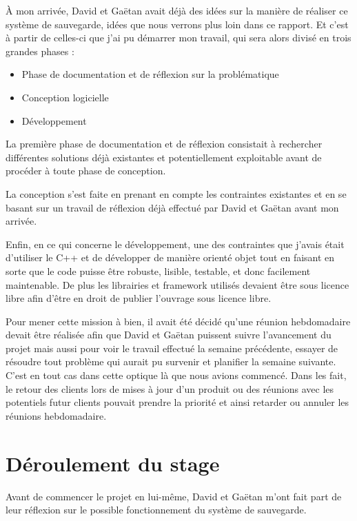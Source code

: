 \documentclass[a4paper,10pt, twoside]{report}
\begin{document}
\begin{spacing}{1.2}
\`A mon arriv\'ee, David et Ga\"etan avait d\'ej\`a des id\'ees sur la
mani\`ere de r\'ealiser ce syst\`eme de sauvegarde, id\'ees que nous verrons
plus loin dans ce rapport. Et c'est \`a partir de celles-ci que j'ai pu
d\'emarrer mon travail, qui sera alors divis\'e en trois grandes phases :

\begin{itemize}
 \item Phase de documentation et de r\'eflexion sur la probl\'ematique
 \item Conception logicielle
 \item D\'eveloppement
\end{itemize}

La premi\`ere phase de documentation et de r\'eflexion consistait \`a
rechercher diff\'erentes solutions d\'ej\`a existantes et potentiellement
exploitable avant de proc\'eder \`a toute phase de conception.

La conception s'est faite en prenant en compte les contraintes existantes
et en se basant sur un travail de r\'eflexion d\'ej\`a effectu\'e par David et
Ga\"etan avant mon arriv\'ee.

Enfin, en ce qui concerne le d\'eveloppement, une des contraintes que j'avais
\'etait d'utiliser le C++ et de d\'evelopper de mani\`ere orient\'e objet tout
en faisant en sorte que le code puisse \^etre robuste, lisible, testable, et
donc facilement maintenable. De plus les librairies et framework utilis\'es
devaient \^etre sous licence libre afin d'\^etre en droit de publier l'ouvrage
sous licence libre.

Pour mener cette mission \`a bien, il avait \'et\'e d\'ecid\'e qu'une r\'eunion
hebdomadaire devait \^etre r\'ealis\'ee afin que David et Ga\"etan puissent
suivre l'avancement du projet mais aussi pour voir le travail effectu\'e la
semaine pr\'ec\'edente, essayer de r\'esoudre tout probl\`eme qui aurait pu
survenir et planifier la semaine suivante.
C'est en tout cas dans cette optique l\`a que nous avions commenc\'e. Dans les
fait, le retour des clients lors de mises \`a jour d'un produit ou des
r\'eunions avec les potentiels futur clients pouvait prendre la priorit\'e et
ainsi retarder ou annuler les r\'eunions hebdomadaire.

\section{D\'eroulement du stage}
Avant de commencer le projet en lui-m\^eme, David et Ga\"etan m'ont fait part
de leur r\'eflexion sur le possible fonctionnement du syst\`eme de sauvegarde.


\end{spacing}
\end{document}
